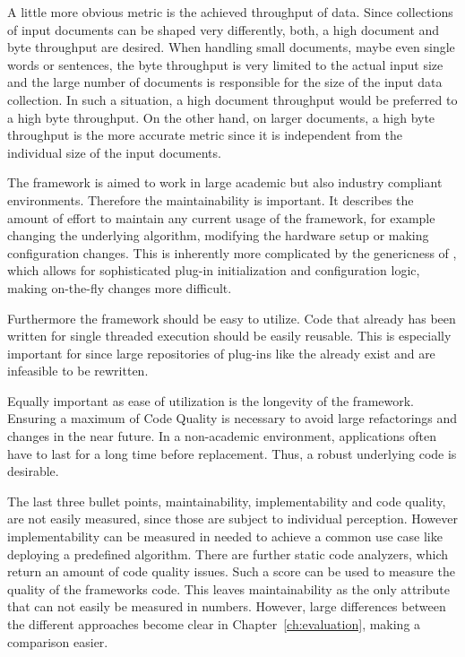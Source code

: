A little more obvious metric is the achieved throughput of data. Since collections of input documents can be shaped very differently, both, a high document and byte throughput are desired. When handling small documents, maybe even single words or sentences, the byte throughput is very limited to the actual input size and the large number of documents is responsible for the size of the input data collection. In such a situation, a high document throughput would be preferred to a high byte throughput. On the other hand, on larger documents, a high byte throughput is the more accurate metric since it is independent from the individual size of the input documents.

The framework is aimed to work in large academic but also industry compliant environments. Therefore the maintainability is important. It describes the amount of effort to maintain any current usage of the framework, for example changing the underlying \nlp{} algorithm, modifying the hardware setup or making configuration changes. This is inherently more complicated by the genericness of \uima{}, which allows for sophisticated plug-in initialization and configuration logic, making on-the-fly changes more difficult.

Furthermore the framework should be easy to utilize. Code that already has been written for single threaded execution should be easily reusable. This is especially important for \uima{} since large repositories of plug-ins like the \dkpro{} \cite{dkpro} already exist and are infeasible to be rewritten. 

Equally important as ease of utilization is the longevity of the framework. Ensuring a maximum of Code Quality is necessary to avoid large refactorings and \api{} changes in the near future. In a non-academic environment, applications often have to last for a long time before replacement. Thus, a robust underlying code is desirable.

The last three bullet points, maintainability, implementability and code quality, are not easily measured, since those are subject to individual perception. However implementability can be measured in \loc{} needed to achieve a common use case like deploying a predefined \nlp{} algorithm. There are further static code analyzers, which return an amount of code quality issues. Such a score can be used to measure the quality of the frameworks code. This leaves maintainability as the only attribute that can not easily be measured in numbers. However, large differences between the different approaches become clear in Chapter~\ref{ch:evaluation}, making a comparison easier.

